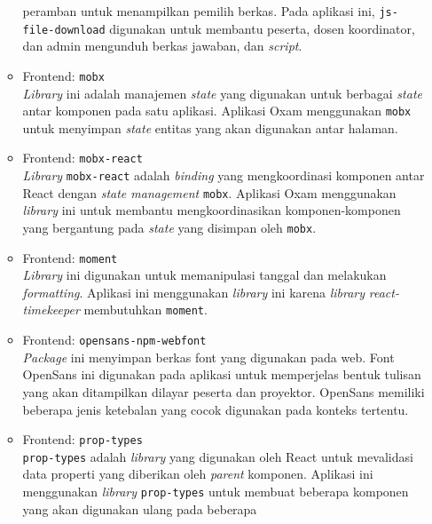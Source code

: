 \begin{itemize}
\begin{itemize}
                    peramban untuk menampilkan pemilih berkas. Pada aplikasi ini, \texttt{js-file-download}
                    digunakan untuk membantu peserta, dosen koordinator, dan admin mengunduh berkas jawaban,
                    dan \textit{script}.
                \item Frontend: \texttt{mobx} \\
                    \textit{Library} ini adalah manajemen \textit{state} yang digunakan untuk berbagai \textit{state}
                    antar komponen pada satu aplikasi. Aplikasi Oxam menggunakan \texttt{mobx} untuk menyimpan 
                    \textit{state} entitas yang akan digunakan antar halaman.
                \item Frontend: \texttt{mobx-react} \\
                    \textit{Library} \texttt{mobx-react} adalah \textit{binding} yang mengkoordinasi komponen
                    antar React dengan \textit{state management} \texttt{mobx}. Aplikasi Oxam menggunakan 
                    \textit{library} ini untuk membantu mengkoordinasikan komponen-komponen yang bergantung
                    pada \textit{state} yang disimpan oleh \texttt{mobx}.
                \item Frontend: \texttt{moment} \\
                    \textit{Library} ini digunakan untuk memanipulasi tanggal dan melakukan \textit{formatting}.
                    Aplikasi ini menggunakan \textit{library} ini karena \textit{library} \textit{react-timekeeper}
                    membutuhkan \texttt{moment}.
                \item Frontend: \texttt{opensans-npm-webfont} \\
                    \textit{Package} ini menyimpan berkas font yang digunakan pada web. Font OpenSans ini
                    digunakan pada aplikasi untuk memperjelas bentuk tulisan yang akan ditampilkan dilayar peserta
                    dan proyektor. OpenSans memiliki beberapa jenis ketebalan yang cocok digunakan pada konteks
                    tertentu.
                \item Frontend: \texttt{prop-types} \\
                    \texttt{prop-types} adalah \textit{library} yang digunakan oleh React untuk mevalidasi data 
                    properti yang diberikan oleh \textit{parent} komponen. Aplikasi ini menggunakan \textit{library}
                    \texttt{prop-types} untuk membuat beberapa komponen yang akan digunakan ulang pada beberapa

\end{itemize}
\end{itemize}
